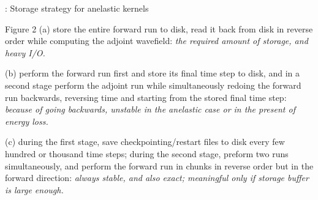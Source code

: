 

\begin{frame}[c]{\titleprefix: Storage strategy for anelastic kernels}

  \centering

  \begin{minipage}{0.4\textwidth}
  \end{minipage}
  \hspace{1 cm}
  \begin{minipage}{0.5\textwidth}
    \tiny
    \begin{figureblock}{Figure 2}
      (a) store the entire forward run to disk, read it back from disk in
      reverse order while computing the adjoint wavefield:
      \emph{the required amount of storage, and heavy I/O.}

      (b) perform the forward run first and store its final time step to disk,
      and in a second stage perform the adjoint run while simultaneously
      redoing the forward run backwards, reversing time and starting from
      the stored final time step:
      \emph{because of going backwards, unstable in the anelastic case or
      in the present of energy loss.}

      (c) during the first stage, save checkpointing/restart files to disk
      every few hundred or thousand time steps; during the second stage,
      preform two runs simultaneously, and perform the forward run in chunks
      in reverse order but in the forward direction:
      \emph{always stable, and also exact; meaningful only if storage buffer
      is large enough.}
    \end{figureblock}
  \end{minipage}

\end{frame}
